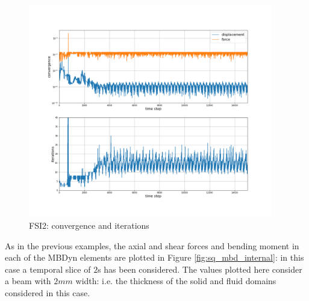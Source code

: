 \begin{figure}[htbp!]
	\centering
	\includegraphics[width=0.95\textwidth, trim=0 80 0 100, clip]{images/FSI2/MBD_iterations_fsi2.png}
	\caption{FSI2: convergence and iterations}
	\label{fig:FSI2_mbd_iter}
\end{figure}

As in the previous examples, the axial and shear forces and bending moment in each of the MBDyn elements are plotted in Figure \ref{fig:sq_mbd_internal}: in this case a temporal slice of $2$\si{s} has been considered. The values plotted here consider a beam with $2mm$ width: i.e. the thickness of the solid and fluid domains considered in this case.

